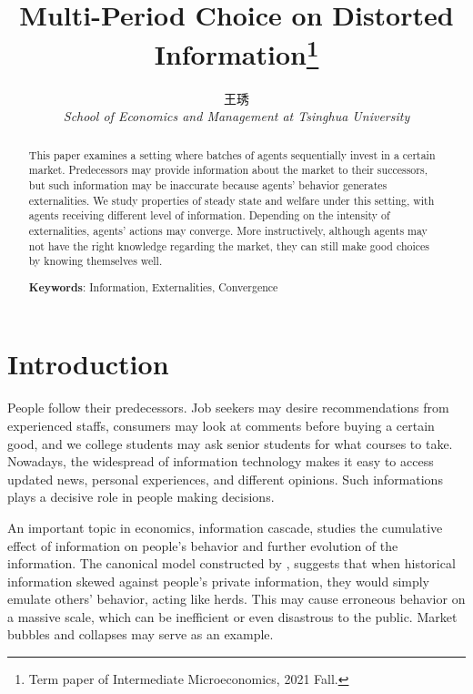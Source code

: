 \documentclass[12pt,english]{article}
\date{}
\theoremstyle{plain}
\theoremstyle{plain}
\begin{document}
\title{Multi-Period Choice on Distorted Information\thanks{Term paper of Intermediate Microeconomics, 2021 Fall.}}
\author{\normalsize{\kaishu 王琇}\\
{\normalsize \textit{School of Economics and Management at Tsinghua University}}}
\maketitle
\begin{abstract}
	This paper examines a setting where batches of agents sequentially invest in a certain market. Predecessors may provide information about the market to their successors, but such information may be inaccurate because agents' behavior generates externalities. We study properties of steady state and welfare under this setting, with agents receiving different level of information. Depending on the intensity of externalities, agents' actions may converge. More instructively, although agents may not have the right knowledge regarding the market, they can still make good choices by knowing themselves well. \\\par
	\noindent \textbf{Keywords}: Information, Externalities, Convergence
\end{abstract}




\section{Introduction}
	People follow their predecessors. Job seekers may desire recommendations from experienced staffs, consumers may look at comments before buying a certain good, and we college students may ask senior students for what courses to take.
	Nowadays, the widespread of information technology makes it easy to access updated news, personal experiences, and different opinions. Such informations plays a decisive role in people making decisions.\par
	
	An important topic in economics, information cascade, studies the cumulative effect of information on people's behavior and further evolution of the information. The canonical model constructed by \citet{Banjeree}, \citet{Welch} suggests that when historical information skewed against people's private information, they would simply emulate others' behavior, acting like herds. This may cause erroneous behavior on a massive scale, which can be inefficient or even disastrous to the public. Market bubbles and collapses may serve as an example.\par
	
\end{document}

